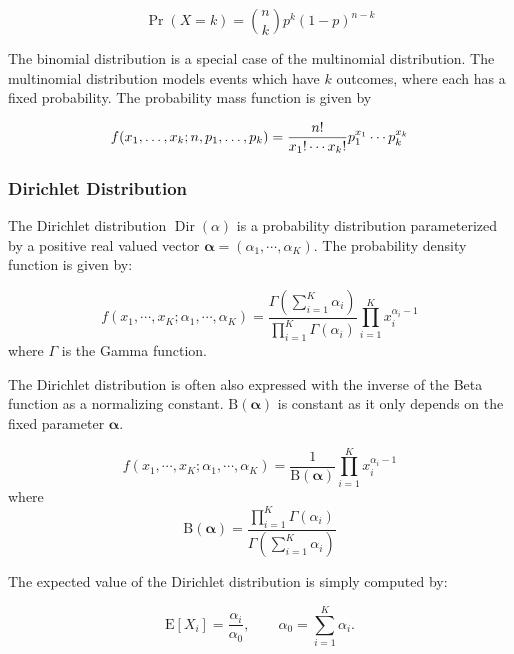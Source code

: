 \documentclass[a4paper,ngerman, english]{atseminar}
\DeclareMathOperator{\Dir}{Dir}
\begin{document}
\begin{equation} \label{binom}
\Pr(X = k) = \binom n k  p^k(1-p)^{n-k}
\end{equation}


The binomial distribution is a special case of the multinomial distribution.
The multinomial distribution models events which have $k$ outcomes, 
where each has a fixed probability. The probability mass function is given by 

\begin{equation}
f(x_1,\ldots,x_k;n,p_1,\ldots,p_k) = { \displaystyle {n! \over x_1!\cdots x_k!}p_1^{x_1}\cdots p_k^{x_k}}
\end{equation}


\subsubsection{Dirichlet Distribution}
The Dirichlet distribution $\Dir(\alpha)$ is a probability distribution parameterized by a positive real valued vector $\boldsymbol{\alpha}=(\alpha_1,\cdots,\alpha_K)$.
The probability density function is given by:

\begin{equation}
f \left(x_1,\cdots, x_{K}; \alpha_1,\cdots, \alpha_K \right) = \frac{\Gamma\left(\sum_{i=1}^K \alpha_i\right)}{\prod_{i=1}^K \Gamma(\alpha_i)} \prod_{i=1}^K x_i^{\alpha_i - 1}
\end{equation}
where $\Gamma$ is the Gamma function.

The Dirichlet distribution is often also expressed with the inverse of the Beta function as a normalizing constant.
${\mathrm{B}(\boldsymbol\alpha)}$ is constant as it only depends on the fixed parameter $\boldsymbol\alpha$.

\begin{equation}
f \left(x_1,\cdots, x_{K}; \alpha_1,\cdots, \alpha_K \right) = \frac{1}{\mathrm{B}(\boldsymbol\alpha)} \prod_{i=1}^K x_i^{\alpha_i - 1}
\end{equation}
 where 
 \begin{equation} 
 \mathrm{B}(\boldsymbol\alpha) = \frac{\prod_{i=1}^K \Gamma(\alpha_i)}{\Gamma\left(\sum_{i=1}^K \alpha_i\right)}
 \end{equation}


The expected value of the Dirichlet distribution is simply computed by:

\begin{equation}
\mathrm{E}[X_i] = \frac{\alpha_i}{\alpha_0}, \qquad \alpha_0 = \sum_{i=1}^K\alpha_i.
\end{equation}
\end{document}
